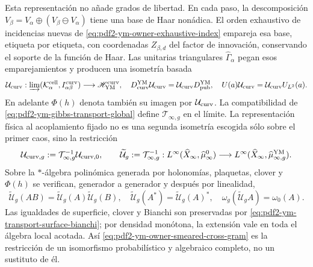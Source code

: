Esta representación no añade grados de libertad. En cada paso, la descomposición
$V_\beta=V_\alpha\oplus(V_\beta\ominus V_\alpha)$ tiene una base de Haar
nonádica. El orden exhaustivo de incidencias nuevas de
\eqref{eq:pdf2-ym-owner-exhaustive-index} empareja esa base, etiqueta por etiqueta,
con coordenadas $Z_{\beta,d}$ del factor de innovación, conservando el soporte de la
función de Haar. Las unitarias triangulares $\widehat\Gamma_\alpha$ pegan esos
emparejamientos y producen una isometría basada
\begin{equation}\label{eq:pdf2-ym-owner-publication-into-physical}
 \mathcal U_{\rm curv}:
 \varinjlim(\mathcal K_\alpha^{\rm cell},I_{\alpha\beta}^{\rm curv})
 \longrightarrow\mathscr H_{\rm YM}^{\rm curv},
 \quad
 D_{\rm curv}^{\rm YM}\mathcal U_{\rm curv}
 =\mathcal U_{\rm curv}D_{\rm pub}^{\rm YM},
 \quad U(a)\mathcal U_{\rm curv}=\mathcal U_{\rm curv}U_{L^2}(a).
\end{equation}
En adelante $\Phi(h)$ denota también su imagen por $\mathcal U_{\rm curv}$.
La compatibilidad de \eqref{eq:pdf2-ym-gibbs-transport-global} define
$\mathcal T_{\infty,g}$ en el límite. La representación física al acoplamiento fijado
no es una segunda isometría escogida sólo sobre el primer caos, sino la restricción
\begin{equation}\label{eq:pdf2-ym-full-publication-restriction}
 \mathcal U_{{\rm curv},g}
 :=\mathcal T_{\infty,g}^{-1}\mathcal U_{{\rm curv},0},
 \qquad
 \widetilde{\mathcal U}_g
 :=\mathcal T_{\infty,g}^{-1}:
 L^\infty(\widehat X_\infty,\widehat\mu_\infty^0)
 \longrightarrow
 L^\infty(\widehat X_\infty,\widehat\mu_{\infty,g}^{\rm YM}).
\end{equation}
Sobre la $*$-álgebra polinómica generada por holonomías, plaquetas, clover y
$\Phi(h)$ se verifican, generador a generador y después por linealidad,
\begin{equation}\label{eq:pdf2-ym-full-publication-products}
 \widetilde{\mathcal U}_g(AB)
 =\widetilde{\mathcal U}_g(A)\widetilde{\mathcal U}_g(B),
 \quad
 \widetilde{\mathcal U}_g(A^*)=\widetilde{\mathcal U}_g(A)^*,
 \quad
 \omega_g(\widetilde{\mathcal U}_gA)=\omega_0(A).
\end{equation}
Las igualdades de superficie, clover y Bianchi son preservadas por
\eqref{eq:pdf2-ym-transport-surface-bianchi}; por densidad monótona, la extensión
vale en toda el álgebra local acotada. Así
\eqref{eq:pdf2-ym-owner-smeared-cross-gram} es la restricción de un isomorfismo
probabilístico y algebraico completo, no un sustituto de él.

